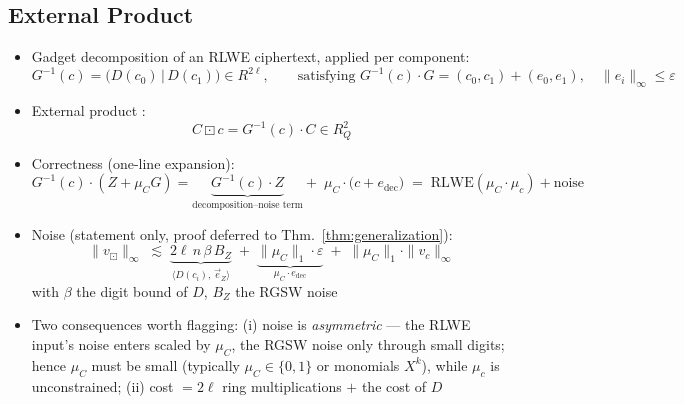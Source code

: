 \subsection{External Product}
\begin{itemize}
    \item Gadget decomposition of an RLWE ciphertext, applied per component:
          \begin{equation}
              G^{-1}(c) = \big(D(c_0) \,\big|\, D(c_1)\big) \in R^{2\ell},
              \qquad \text{satisfying } G^{-1}(c)\cdot G = (c_0, c_1) + (e_0, e_1),
              \quad \|e_i\|_\infty \le \varepsilon
          \end{equation}
    \item External product \cite{CGGI16,BP16}:
          \begin{equation}
              \label{eq:ext_prod}
              C \boxdot c = G^{-1}(c) \cdot C \in R_Q^2
          \end{equation}
    \item Correctness (one-line expansion):
          \begin{equation*}
              G^{-1}(c)\cdot(Z + \mu_C G)
              = \underbrace{G^{-1}(c)\cdot Z}_{\text{decomposition--noise term}}
              + \;\mu_C\cdot\big(c + e_{\mathrm{dec}}\big)
              \;=\; \mathrm{RLWE}(\mu_C \cdot \mu_c) + \text{noise}
          \end{equation*}
    \item Noise (statement only, proof deferred to Thm.~\ref{thm:generalization}):
          \begin{equation*}
              \|v_{\boxdot}\|_\infty \;\lesssim\;
              \underbrace{2\ell\, n\, \beta\, B_{Z}}_{\langle D(c_i),\, \vec{e}_Z\rangle}
              \;+\;
              \underbrace{\|\mu_C\|_1 \cdot \varepsilon}_{\mu_C \cdot e_{\mathrm{dec}}}
              \;+\; \|\mu_C\|_1 \cdot \|v_c\|_\infty
          \end{equation*}
          with $\beta$ the digit bound of $D$, $B_Z$ the RGSW noise
    \item Two consequences worth flagging:
          (i) noise is \emph{asymmetric} --- the RLWE input's noise enters
          scaled by $\mu_C$, the RGSW noise only through small digits; hence
          $\mu_C$ must be small (typically $\mu_C \in \{0,1\}$ or monomials
          $X^k$), while $\mu_c$ is unconstrained;
          (ii) cost $= 2\ell$ ring multiplications $+$ the cost of $D$
\end{itemize}

